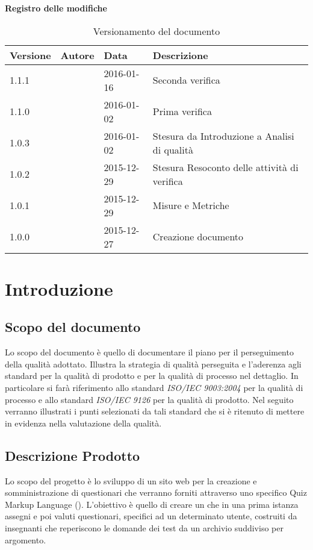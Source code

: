 \documentclass[12pt,a4paper]{article}
\begin{document}
\Large{\textbf{Registro delle modifiche}}\\
\normalsize

\begin{table}[h]
\begin{center}

\begin{tabular}{p{} p{} p{} p{}}
\toprule
\textbf{Versione}	&	\textbf{Autore}	&	\textbf{Data}	&	\textbf{Descrizione}\\
\midrule
\midrule
1.1.1 & \AVE{} & 2016-01-16 & Seconda verifica \\
\midrule
1.1.0 & \NDC{} & 2016-01-02 & Prima verifica \\
\midrule
1.0.3 & \AB{} & 2016-01-02 &  Stesura da Introduzione a Analisi di qualità\\
\midrule
1.0.2 & \IB{} & 2015-12-29 &  Stesura Resoconto delle attività di verifica\\
\midrule
1.0.1 & \AVI{} & 2015-12-29 &  Misure e Metriche \\
\midrule
1.0.0 & \IB{} & 2015-12-27 &  Creazione documento \\
\bottomrule
\end{tabular}
\caption{Versionamento del documento}
\label{tabVers1}
\end{center}
\end{table}

\newpage
\tableofcontents
\newpage

\listoftables
\listoffigures
\newpage

\section{Introduzione}
\subsection{Scopo del documento}
Lo scopo del documento è quello di documentare il piano per il perseguimento della qualità adottato. Illustra la strategia di qualità perseguita e l'aderenza agli standard per la qualità di prodotto e per la qualità di processo nel dettaglio. In particolare si farà riferimento allo standard \textit{ISO/IEC 9003:2004} per la qualità di processo e allo standard \textit{ISO/IEC 9126} per la qualità di prodotto.
Nel seguito verranno illustrati i punti selezionati da tali standard che si è ritenuto di mettere in evidenza nella valutazione della qualità.

\subsection{Descrizione Prodotto}
Lo scopo del progetto è lo sviluppo di un sito web per la creazione e somministrazione di questionari che verranno forniti attraverso uno specifico Quiz Markup Language (). L'obiettivo è quello di creare un  che in una prima istanza assegni e poi valuti questionari, specifici ad un determinato utente, costruiti da insegnanti che reperiscono le domande dei test da un archivio suddiviso per argomento.
\end{document}
